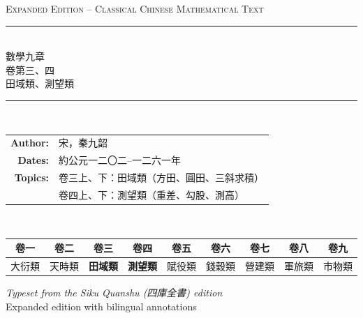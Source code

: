 \documentclass[11pt,a4paper]{article}
\begin{document}
\begin{titlepage}
\centering
\vspace*{2.5cm}

{\fontsize{13}{15}\selectfont\textsc{Expanded Edition -- Classical Chinese Mathematical Text}}\\[0.3cm]
{\color{rulecolor}\rule{8cm}{0.5pt}}\\[0.8cm]

{\fontsize{26}{32}\selectfont\textcolor{titlecolor}{數學九章}}\\[0.6cm]
{\fontsize{20}{24}\selectfont\textcolor{sectioncolor}{卷第三、四}}\\[0.4cm]
{\fontsize{15}{19}\selectfont\textcolor{subsectioncolor}{田域類、測望類}}\\[1.2cm]

{\color{rulecolor}\rule{8cm}{0.5pt}}\\[0.8cm]

{\large
\begin{tabular}{rl}
\textbf{Author:} & 宋，秦九韶 \\[0.4em]
\textbf{Dates:} & 約公元一二〇二--一二六一年 \\[0.4em]
\textbf{Topics:} & 卷三上、下：田域類（方田、圓田、三斜求積） \\[0.2em]
                & 卷四上、下：測望類（重差、勾股、測高） \\
\end{tabular}
}\\[1.5cm]

{\fontsize{12}{15}\selectfont
\begin{tabular}{|c|c|c|c|c|c|c|c|c|}
\hline
\textbf{卷一} & \textbf{卷二} & \textbf{卷三} & \textbf{卷四} & \textbf{卷五} & \textbf{卷六} & \textbf{卷七} & \textbf{卷八} & \textbf{卷九} \\
\hline
大衍類 & 天時類 & \textcolor{sectioncolor}{\textbf{田域類}} & \textcolor{sectioncolor}{\textbf{測望類}} & 賦役類 & 錢穀類 & 營建類 & 軍旅類 & 市物類 \\
\hline
\end{tabular}
}

\vfill
{\small\textit{Typeset from the Siku Quanshu (四庫全書) edition}}\\
{\small Expanded edition with bilingual annotations}

\end{titlepage}

\tableofcontents
\newpage
\end{document}
